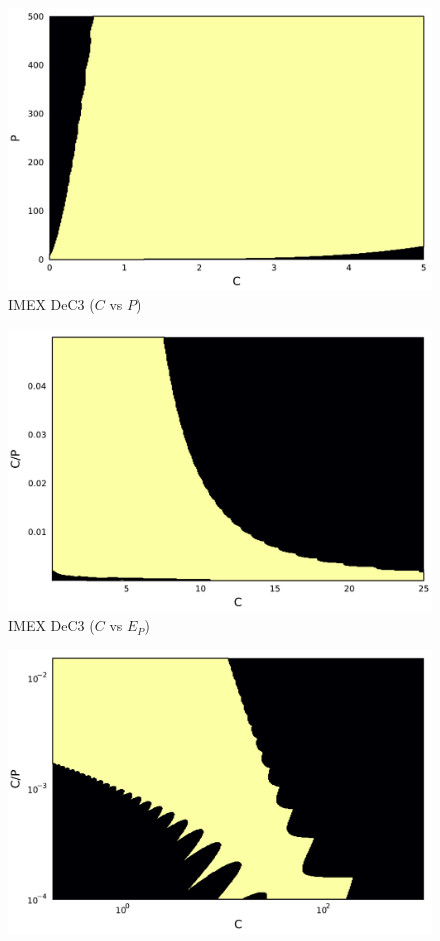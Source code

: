 \begin{example}
\begin{figure}[!h]
\begin{minipage}[t]{0.32\textwidth}
			\includegraphics[width=\textwidth]{pdf/pdepics/disp/contourf_adv_disp_IMEXDeC_equispaced_3_disp_Shu_adv_1_CP.pdf}
			IMEX DeC3 ($C$ vs $P$)
		\end{minipage} 
		\begin{minipage}[t]{0.32\textwidth}
			\centering
			\includegraphics[width=\textwidth]{pdf/pdepics/disp/contourf_adv_disp_IMEXDeC_equispaced_3_disp_Shu_adv_1_CE.pdf}
			IMEX DeC3 ($C$ vs $E_P$)
		\end{minipage}
		\begin{minipage}[t]{0.32\textwidth}
			\centering
			\includegraphics[width=\textwidth]{pdf/pdepics/disp/contourf_adv_disp_IMEXDeC_equispaced_3_disp_Shu_adv_1_CE_zoom.pdf}

\end{minipage}
\end{figure}
\end{example}
